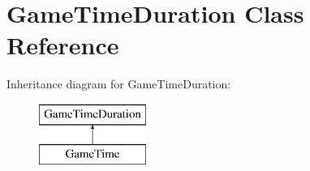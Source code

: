 \hypertarget{class_game_time_duration}{}\section{Game\+Time\+Duration Class Reference}
\label{class_game_time_duration}
Inheritance diagram for Game\+Time\+Duration\+:\begin{figure}[H]
\begin{center}
\leavevmode
\includegraphics[height=2.000000cm]{class_game_time_duration}
\end{center}
\end{figure}
